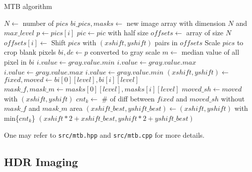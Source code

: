 \documentclass[11pt]{article}
\begin{document}
 

\begin{algorithm}
\caption{MTB algorithm}
\begin{algorithmic}[1]
	\State $N\gets$ number of $pics$
	\State $bi\_pics, masks\gets$ new image array with dimension $N$ and $max\_level$
		\State $p\gets pics[i]$
			\State {}
			\State $pic\gets pic$ with half size
		\EndFor
	\EndFor
	\State $offsets\gets$ array of size $N$
		\State $offsets[i]\gets$
	\EndFor
	\State Shift $pics$ with $(xshift, yshift)$ pairs in $offsets$
	\State Scale $pics$ to crop blank pixels
\EndFunction
\Statex
{}
	\State $bi, de\gets p$ converted to gray scale
	\State $m\gets$ median value of all pixel in $bi$
			\State $i.value\gets gray.value.min$
		\Else
			\State $i.value\gets gray.value.max$
		\EndIf
	\EndFor
			\State $i.value\gets gray.value.max$
		\Else
			\State $i.value\gets gray.value.min$
		\EndIf
	\EndFor
\EndFunction
\Statex
{}
		\State {}
	\EndIf
	\State $(xshift, yshift)\gets$
	\State $fixed, moved\gets bi[0][level], bi[i][level]$
	\State $mask\_f, mask\_m\gets masks[0][level], masks[i][level]$
		\State $moved\_sh\gets moved$ with $(xshift, yshift)$
		\State $cnt_k\gets$ \# of diff between $fixed$ and $moved\_sh$
without $mask\_f$ and $mask\_m$ area	
	\EndFor
	\State $(xshift\_best, yshift\_best)\gets(xshift, yshift)$ with min\{$cnt_k$\}
	\State\Return$(xshift*2+xshift\_best, yshift*2+yshift\_best)$
\EndFunction
\end{algorithmic}
\end{algorithm}

One may refer to \texttt{src/mtb.hpp} and \texttt{src/mtb.cpp} for more details.

\subsection{HDR Imaging}
\end{document}
